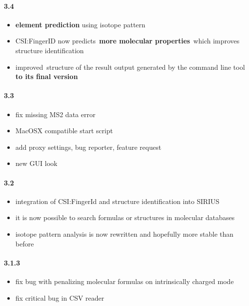 \paragraph{3.4}

\begin{itemize}

\item
  \textbf{element prediction} using isotope pattern
\item
  CSI:FingerID now predicts~\textbf{more molecular properties}~which
  improves structure identification
\item
  improved~structure of the result output generated by the command line
  tool \textbf{to its final version}
\end{itemize}

\paragraph{3.3}

\begin{itemize}

\item
  fix missing MS2 data error
\item
  MacOSX compatible start script
\item
  add proxy settings, bug reporter, feature request
\item
  new GUI look
\end{itemize}

\paragraph{3.2}

\begin{itemize}

\item
  integration of CSI:FingerId and structure identification into SIRIUS
\item
  it is now possible to search formulas or structures in molecular
  databases
\item
  isotope pattern analysis is now rewritten and hopefully more stable
  than before
\end{itemize}

\paragraph{3.1.3}

\begin{itemize}

\item
  fix bug with penalizing molecular formulas on intrinsically charged
  mode
\item
  fix critical bug in CSV reader
\end{itemize}

